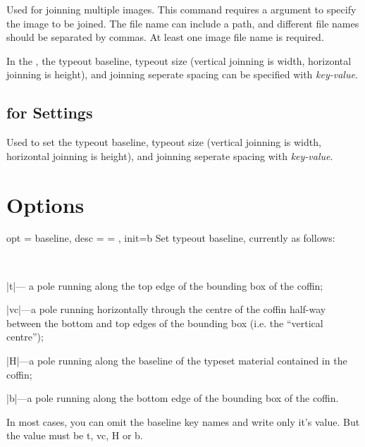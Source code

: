 \documentclass[full]{l3doc}
\begin{document}
\begin{documentation}
  Used for joinning multiple images. This command requires a argument
  to specify the image to be joined. The file name can include a path, 
  and different file names should be separated by commas. 
  At least one image file name is required.

  In the , the typeout baseline, typeout size
  (vertical joinning is width, horizontal joinning is height), and 
  joinning seperate spacing can be specified with \textit{key-value}.

\subsection{ for Settings}
\begin{function}{\joinset}
  \begin{syntax}
     
  \end{syntax}

\end{function}

  Used to set the typeout baseline, typeout size
  (vertical joinning is width, horizontal joinning is height), and 
  joinning seperate spacing with \textit{key-value}.

\section{Options}

\begin{option}{ opt = baseline, desc = {= }, init=b }
  Set typeout baseline, currently as follows:
\end{option}\\
\begin{Description}
  \item |t|--- a pole running along the top edge of the bounding box of the coffin;
  \item |vc|---a pole running horizontally through the centre of the coffin half-way between the
bottom and top edges of the bounding box (i.e. the “vertical centre”);
  \item |H|---a pole running along the baseline of the typeset material contained in the coffin;
  \item |b|---a pole running along the bottom edge of the bounding box of the coffin.
\end{Description}
\begin{noteen}
  In most cases, you can omit the baseline key names and write only it's value. 
  But the value must be t, vc, H or b.
\end{noteen}


\end{documentation}
\end{document}
